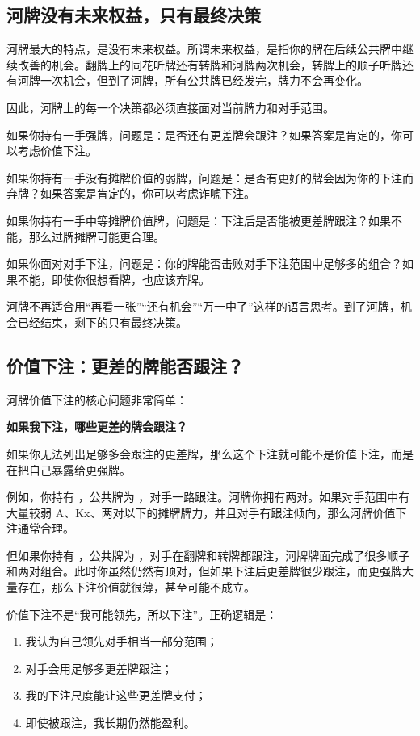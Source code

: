 \subsection{河牌没有未来权益，只有最终决策}

河牌最大的特点，是没有未来权益。所谓未来权益，是指你的牌在后续公共牌中继续改善的机会。翻牌上的同花听牌还有转牌和河牌两次机会，转牌上的顺子听牌还有河牌一次机会，但到了河牌，所有公共牌已经发完，牌力不会再变化。

因此，河牌上的每一个决策都必须直接面对当前牌力和对手范围。

如果你持有一手强牌，问题是：是否还有更差牌会跟注？如果答案是肯定的，你可以考虑价值下注。

如果你持有一手没有摊牌价值的弱牌，问题是：是否有更好的牌会因为你的下注而弃牌？如果答案是肯定的，你可以考虑诈唬下注。

如果你持有一手中等摊牌价值牌，问题是：下注后是否能被更差牌跟注？如果不能，那么过牌摊牌可能更合理。

如果你面对对手下注，问题是：你的牌能否击败对手下注范围中足够多的组合？如果不能，即使你很想看牌，也应该弃牌。

河牌不再适合用“再看一张”“还有机会”“万一中了”这样的语言思考。到了河牌，机会已经结束，剩下的只有最终决策。

\subsection{价值下注：更差的牌能否跟注？}

河牌价值下注的核心问题非常简单：

\begin{center}
\textbf{如果我下注，哪些更差的牌会跟注？}
\end{center}

如果你无法列出足够多会跟注的更差牌，那么这个下注就可能不是价值下注，而是在把自己暴露给更强牌。

例如，你持有 ，公共牌为 ，对手一路跟注。河牌你拥有两对。如果对手范围中有大量较弱 A、Kx、两对以下的摊牌牌力，并且对手有跟注倾向，那么河牌价值下注通常合理。

但如果你持有 ，公共牌为 ，对手在翻牌和转牌都跟注，河牌牌面完成了很多顺子和两对组合。此时你虽然仍然有顶对，但如果下注后更差牌很少跟注，而更强牌大量存在，那么下注价值就很薄，甚至可能不成立。

价值下注不是“我可能领先，所以下注”。正确逻辑是：

\begin{enumerate}
\item 我认为自己领先对手相当一部分范围；
\item 对手会用足够多更差牌跟注；
\item 我的下注尺度能让这些更差牌支付；
\item 即使被跟注，我长期仍然能盈利。
\end{enumerate}


